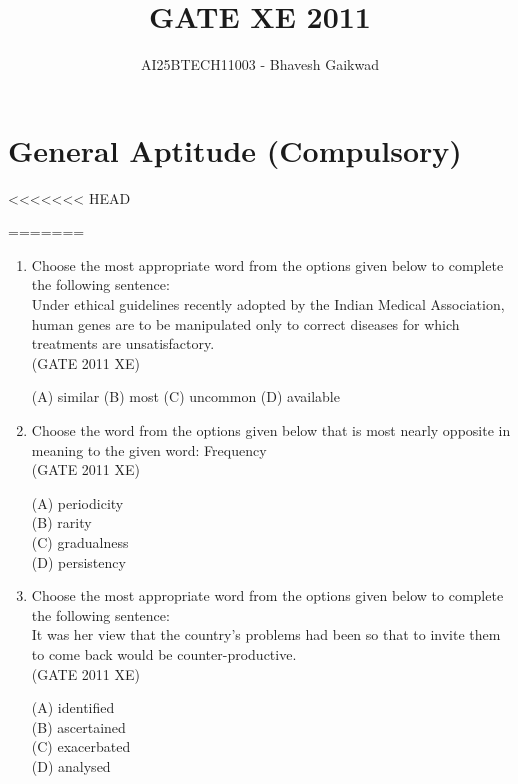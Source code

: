 \documentclass[journal,12pt,onecolumn]{IEEEtran}
\begin{document}
\title{GATE XE 2011}
\author{AI25BTECH11003 - Bhavesh Gaikwad}
\maketitle

\section*{General Aptitude (Compulsory)}
<<<<<<< HEAD
\bigskip
\begin{enumerate}
=======
\vspace{1cm}
\begin{enumerate}[label=\textbf{Q\arabic*.},itemsep=2em]
>>>>>>> d734831 (Assignment)

\item Choose the most appropriate word from the options given below to complete the following sentence: \\
Under ethical guidelines recently adopted by the Indian Medical Association, human genes are to be manipulated only to correct diseases for which treatments are unsatisfactory.\\

\hfill{(GATE 2011 XE)} \\
\begin{multicols}{4}
(A) similar 
(B) most 
(C) uncommon 
(D) available
\end{multicols}

\item Choose the word from the options given below that is most nearly opposite in meaning to the given word: Frequency\\

\hfill{(GATE 2011 XE)} \\
\begin{multicols}{4}
(A) periodicity \\
(B) rarity \\
(C) gradualness \\
(D) persistency
\end{multicols}

\item Choose the most appropriate word from the options given below to complete the following sentence: \\
It was her view that the country's problems had been so that to invite them to come back would be counter-productive. \\

\hfill{(GATE 2011 XE)} \\
\begin{multicols}{4}
(A) identified \\
(B) ascertained \\
(C) exacerbated \\
(D) analysed
\end{multicols}


\end{enumerate}
\end{enumerate}
\end{document}
